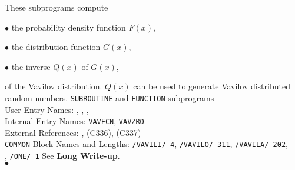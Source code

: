                     
                  
\Submitter{}                         
These subprograms compute
\begin{DLtt}{12}
\item[$\bullet$] the probability density function $F(x)$,
\item[$\bullet$] the distribution function $G(x)$,
\item[$\bullet$] the inverse $Q(x)$ of $G(x)$,
\end{DLtt}
of the Vavilov distribution. $Q(x)$ can be used to generate Vavilov
distributed random numbers.
\Structure
{\tt SUBROUTINE} and {\tt FUNCTION} subprograms \\
User Entry Names: , , ,
\\
Internal Entry Names: {\tt VAVFCN}, {\tt VAVZRO}\\
External References: ,  (C336),
 (C337) \\
{\tt COMMON} Block Names and Lengths: {\tt/VAVILI/ 4},
{\tt/VAVILO/ 311}, {\tt/VAVILA/ 202}, \\
\hspace*{60mm}{\tt/FORFCN/ 2}, {\tt/ONE/ 1}
\Usage
See {\bf Long Write-up}.
\\ $\bullet$
